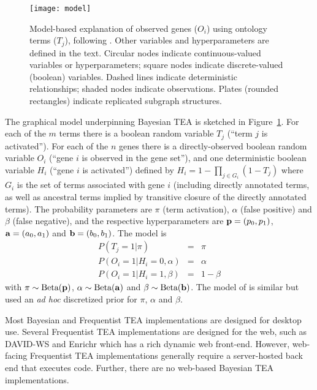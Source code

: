 \begin{figure}
\texttt{[image: model]}
\caption{
  \label{fig:model}
  Model-based explanation of observed genes ($O_i$) using ontology terms ($T_j$), following \cite{pmid20172960}.
  Other variables and hyperparameters are defined in the text.
  Circular nodes indicate continuous-valued variables or hyperparameters;
  square nodes indicate discrete-valued (boolean) variables.
  Dashed lines indicate deterministic relationships;
  shaded nodes indicate observations.
  Plates (rounded rectangles) indicate replicated subgraph structures.
}
\end{figure}

The graphical model underpinning Bayesian TEA is sketched in Figure~\ref{fig:model}.
For each of the $m$ terms there
is a boolean random variable
$T_j$ (``term $j$ is activated'').
For each of the $n$ genes there is a directly-observed boolean random variable
$O_i$ (``gene $i$ is observed in the gene set''),
and one deterministic boolean variable
$H_i$ (``gene $i$ is activated'')
defined by $H_i = 1 - \prod_{j \in G_i} (1 - T_j)$
where $G_i$ is the set of terms associated with gene $i$
(including directly annotated terms, as well as ancestral terms implied by transitive closure of the directly annotated terms).
The probability parameters are $\pi$ (term activation), $\alpha$ (false positive) and $\beta$ (false negative),
and the respective hyperparameters are ${\bf p}=(p_0,p_1)$, ${\bf a}=(a_0,a_1)$ and ${\bf b}=(b_0,b_1)$.
The model is
\begin{eqnarray*}
P(T_j=1|\pi) & = & \pi \\
P(O_i=1|H_i=0,\alpha) & = & \alpha \\
P(O_i=1|H_i=1,\beta) & = & 1-\beta
\end{eqnarray*}
with
$\pi \sim \mbox{Beta}({\bf p})$,
$\alpha \sim \mbox{Beta}({\bf a})$ and
$\beta \sim \mbox{Beta}({\bf b})$.
The model of \cite{pmid20172960} is similar but used an
{\em ad hoc} discretized prior for $\pi$, $\alpha$ and $\beta$.

Most Bayesian and Frequentist TEA implementations are designed for desktop use.
Several Frequentist TEA implementations are designed for the web, such as
DAVID-WS \citep{pmid22543366} and
Enrichr \citep{pmid23586463} %
which has a rich dynamic web front-end.
However, web-facing Frequentist TEA implementations generally require a server-hosted back end that executes code.
Further, there are no web-based Bayesian TEA implementations.

